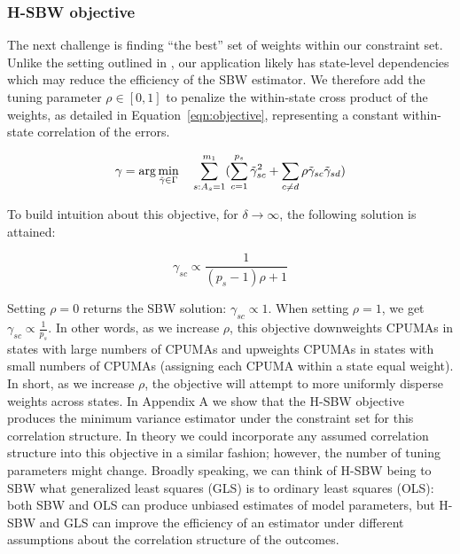 \documentclass[aoas]{imsart}
\theoremstyle{plain}
\theoremstyle{remark}
\begin{document}
\subsubsection{H-SBW objective}

The next challenge is finding ``the best'' set of weights within our constraint set. Unlike the setting outlined in \cite{zubizarreta2015stable}, our application likely has state-level dependencies which may reduce the efficiency of the SBW estimator. We therefore add the tuning parameter $\rho \in [0, 1]$ to penalize the within-state cross product of the weights, as detailed in Equation~\ref{eqn:objective}, representing a constant within-state correlation of the errors.

\begin{equation}\label{eqn:objective}
\gamma = \arg\min_{\tilde{\gamma} \in \Gamma} \quad \sum_{s: A_s = 1}^{m_1}(\sum_{c = 1}^{p_s} \tilde{\gamma}_{sc}^2 + \sum_{c \ne d}\rho \tilde{\gamma}_{sc}\tilde{\gamma}_{sd})\\
\end{equation}

To build intuition about this objective, for $\delta \to \infty$, the following solution is attained:

\begin{equation}\label{eqn:sbwsol}
\gamma_{sc} \propto \frac{1}{(p_s - 1)\rho + 1}
\end{equation}

Setting $\rho = 0$ returns the SBW solution: $\gamma_{sc} \propto 1$. When setting $\rho = 1$, we get $\gamma_{sc} \propto \frac{1}{p_s}$. In other words, as we increase $\rho$, this objective downweights CPUMAs in states with large numbers of CPUMAs and upweights CPUMAs in states with small numbers of CPUMAs (assigning each CPUMA within a state equal weight). In short, as we increase $\rho$, the objective will attempt to more uniformly disperse weights across states. In Appendix A we show that the H-SBW objective produces the minimum variance estimator under the constraint set for this correlation structure. In theory we could incorporate any assumed correlation structure into this objective in a similar fashion; however, the number of tuning parameters might change. Broadly speaking, we can think of H-SBW being to SBW what generalized least squares (GLS) is to ordinary least squares (OLS): both SBW and OLS can produce unbiased estimates of model parameters, but H-SBW and GLS can improve the efficiency of an estimator under different assumptions about the correlation structure of the outcomes.
\end{document}

